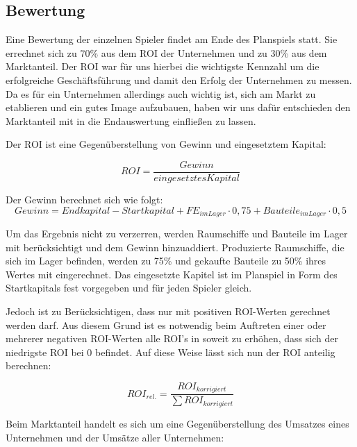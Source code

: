 \subsection{Bewertung}
\label{sub:spielwelt-logik-bewertung}

Eine Bewertung der einzelnen Spieler findet am Ende des Planspiels statt. Sie errechnet sich zu 70\% aus dem
ROI der Unternehmen und zu 30\% aus dem Marktanteil. Der ROI war für uns hierbei die wichtigste Kennzahl um die
erfolgreiche Geschäftsführung und damit den Erfolg der Unternehmen zu messen. Da es für ein Unternehmen allerdings
auch wichtig ist, sich am Markt zu etablieren und ein gutes Image aufzubauen, haben wir uns dafür entschieden den
Marktanteil mit in die Endauswertung einfließen zu lassen.

Der ROI ist eine Gegenüberstellung von Gewinn und eingesetztem Kapital:

\begin{equation}
     ROI = \frac{Gewinn}{eingesetztes Kapital}
     \label{alg:spielwelt-logik-bewertung-ROI}
\end{equation}

Der Gewinn berechnet sich wie folgt:
\begin{equation}
     Gewinn = Endkapital - Startkapital + FE_{im Lager} \cdot 0,75 + Bauteile_{im Lager} \cdot 0,5
     \label{alg:spielwelt-logik-bewertung-Gewinn}
\end{equation}

Um das Ergebnis nicht zu verzerren, werden Raumschiffe und Bauteile im Lager mit berücksichtigt und dem Gewinn hinzuaddiert.
Produzierte Raumschiffe, die sich im Lager befinden, werden zu 75\% und gekaufte Bauteile zu 50\% ihres Wertes mit eingerechnet.
Das eingesetzte Kapitel ist im Planspiel in Form des Startkapitals fest vorgegeben und für jeden Spieler gleich.

Jedoch ist zu Berücksichtigen, dass nur mit positiven ROI-Werten gerechnet werden darf. Aus diesem Grund ist es notwendig
beim Auftreten einer oder mehrerer negativen ROI-Werten alle ROI's in soweit zu erhöhen, dass sich der niedrigste ROI bei
0 befindet. Auf diese Weise lässt sich nun der ROI anteilig berechnen:

\begin{equation}
     ROI_{rel.} = \frac{ROI_{korrigiert}}{\sum ROI_{korrigiert}}
     \label{alg:spielwelt-logik-bewertung-rel. ROI}
\end{equation}

Beim Marktanteil handelt es sich um eine Gegenüberstellung des Umsatzes eines Unternehmen und der Umsätze aller Unternehmen:

